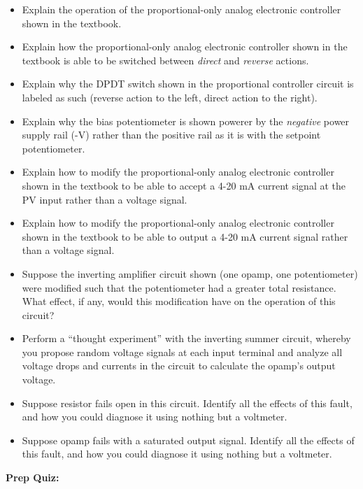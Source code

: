 \begin{itemize}
\item{} Explain the operation of the proportional-only analog electronic controller shown in the textbook.
\item{} Explain how the proportional-only analog electronic controller shown in the textbook is able to be switched between {\it direct} and {\it reverse} actions.
\item{} Explain why the DPDT switch shown in the proportional controller circuit is labeled as such (reverse action to the left, direct action to the right).
\item{} Explain why the bias potentiometer is shown powerer by the {\it negative} power supply rail (-V) rather than the positive rail as it is with the setpoint potentiometer.
\item{} Explain how to modify the proportional-only analog electronic controller shown in the textbook to be able to accept a 4-20 mA current signal at the PV input rather than a voltage signal.
\item{} Explain how to modify the proportional-only analog electronic controller shown in the textbook to be able to output a 4-20 mA current signal rather than a voltage signal.
\item{} Suppose the inverting amplifier circuit shown (one opamp, one potentiometer) were modified such that the potentiometer had a greater total resistance.  What effect, if any, would this modification have on the operation of this circuit?
\item{} Perform a ``thought experiment'' with the inverting summer circuit, whereby you propose random voltage signals at each input terminal and analyze all voltage drops and currents in the circuit to calculate the opamp's output voltage.
\item{} Suppose resistor \underbar{\hskip 30pt} fails open in this circuit.  Identify all the effects of this fault, and how you could diagnose it using nothing but a voltmeter.
\item{} Suppose opamp \underbar{\hskip 30pt} fails with a saturated \underbar{\hskip 30pt} output signal.  Identify all the effects of this fault, and how you could diagnose it using nothing but a voltmeter.
\end{itemize}








\vfil \eject

\noindent
{\bf Prep Quiz:}

